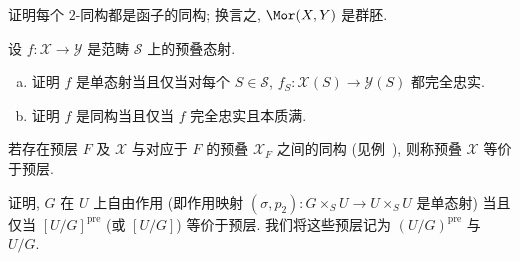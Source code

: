 \begin{exercise}[简单]\label{src:3.4.18}
证明每个 $2$-同构都是函子的同构; 换言之, $\Mor(\mathcal X,\mathcal Y)$ 是群胚.
\end{exercise}
\begin{exercise}[细节]\label{src:3.4.19}
设 $f:\mathcal X\to\mathcal Y$ 是范畴 $\mathcal S$ 上的预叠态射.
\begin{enumerate}[(a)]
\item 证明 $f$ 是单态射当且仅当对每个 $S\in\mathcal S$, $f_S:\mathcal X(S)\to\mathcal Y(S)$ 都完全忠实.
\item 证明 $f$ 是同构当且仅当 $f$ 完全忠实且本质满.
\end{enumerate}
\end{exercise}
若存在预层 $F$ 及 $\mathcal X$ 与对应于 $F$ 的预叠 $\mathcal X_F$ 之间的同构 (见例~), 则称预叠 $\mathcal X$ 等价于预层.
\begin{exercise}[有益的练习]\label{src:3.4.20}
证明, $G$ 在 $U$ 上自由作用 (即作用映射 $(\sigma,p_2):G\times_S U\to U\times_S U$ 是单态射) 当且仅当 $[U/G]^{\mathrm{pre}}$ (或 $[U/G]$) 等价于预层. 我们将这些预层记为 $(U/G)^{\mathrm{pre}}$ 与 $U/G$.
\end{exercise}

